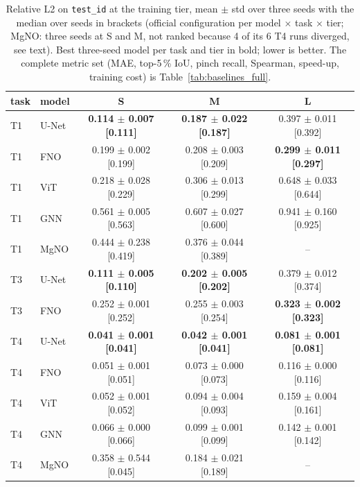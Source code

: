 \begin{table}[tb]
\centering
\scriptsize
\setlength{\tabcolsep}{3.5pt}
\caption{Relative L2 on \texttt{test\_id} at the training tier, mean $\pm$ std over three seeds with the median over seeds in brackets (official configuration per model $\times$ task $\times$ tier; MgNO: three seeds at S and M, not ranked because 4 of its 6 T4 runs diverged, see text). Best three-seed model per task and tier in bold; lower is better. The complete metric set (MAE, top-5\,\% IoU, pinch recall, Spearman, speed-up, training cost) is Table~\ref{tab:baselines_full}.}
\label{tab:results}
\begin{tabular}{llccc}
\toprule
task & model & S & M & L \\
\midrule
T1 & U-Net & \textbf{0.114 $\pm$ 0.007 [0.111]} & \textbf{0.187 $\pm$ 0.022 [0.187]} & 0.397 $\pm$ 0.011 [0.392] \\
T1 & FNO & 0.199 $\pm$ 0.002 [0.199] & 0.208 $\pm$ 0.003 [0.209] & \textbf{0.299 $\pm$ 0.011 [0.297]} \\
T1 & ViT & 0.218 $\pm$ 0.028 [0.229] & 0.306 $\pm$ 0.013 [0.299] & 0.648 $\pm$ 0.033 [0.644] \\
T1 & GNN & 0.561 $\pm$ 0.005 [0.563] & 0.607 $\pm$ 0.027 [0.600] & 0.941 $\pm$ 0.160 [0.925] \\
T1 & MgNO & 0.444 $\pm$ 0.238 [0.419] & 0.376 $\pm$ 0.044 [0.389] & -- \\
T3 & U-Net & \textbf{0.111 $\pm$ 0.005 [0.110]} & \textbf{0.202 $\pm$ 0.005 [0.202]} & 0.379 $\pm$ 0.012 [0.374] \\
T3 & FNO & 0.252 $\pm$ 0.001 [0.252] & 0.255 $\pm$ 0.003 [0.254] & \textbf{0.323 $\pm$ 0.002 [0.323]} \\
T4 & U-Net & \textbf{0.041 $\pm$ 0.001 [0.041]} & \textbf{0.042 $\pm$ 0.001 [0.041]} & \textbf{0.081 $\pm$ 0.001 [0.081]} \\
T4 & FNO & 0.051 $\pm$ 0.001 [0.051] & 0.073 $\pm$ 0.000 [0.073] & 0.116 $\pm$ 0.000 [0.116] \\
T4 & ViT & 0.052 $\pm$ 0.001 [0.052] & 0.094 $\pm$ 0.004 [0.093] & 0.159 $\pm$ 0.004 [0.161] \\
T4 & GNN & 0.066 $\pm$ 0.000 [0.066] & 0.099 $\pm$ 0.001 [0.099] & 0.142 $\pm$ 0.001 [0.142] \\
T4 & MgNO & 0.358 $\pm$ 0.544 [0.045] & 0.184 $\pm$ 0.021 [0.189] & -- \\
\bottomrule
\end{tabular}
\end{table}
